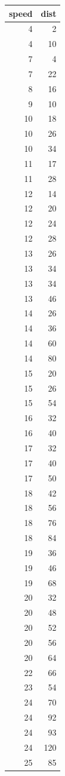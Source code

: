 \documentclass[
]{book}
\begin{document}
\begin{tabular}{r|r}
\hline
speed & dist\\
\hline
4 & 2\\
\hline
4 & 10\\
\hline
7 & 4\\
\hline
7 & 22\\
\hline
8 & 16\\
\hline
9 & 10\\
\hline
10 & 18\\
\hline
10 & 26\\
\hline
10 & 34\\
\hline
11 & 17\\
\hline
11 & 28\\
\hline
12 & 14\\
\hline
12 & 20\\
\hline
12 & 24\\
\hline
12 & 28\\
\hline
13 & 26\\
\hline
13 & 34\\
\hline
13 & 34\\
\hline
13 & 46\\
\hline
14 & 26\\
\hline
14 & 36\\
\hline
14 & 60\\
\hline
14 & 80\\
\hline
15 & 20\\
\hline
15 & 26\\
\hline
15 & 54\\
\hline
16 & 32\\
\hline
16 & 40\\
\hline
17 & 32\\
\hline
17 & 40\\
\hline
17 & 50\\
\hline
18 & 42\\
\hline
18 & 56\\
\hline
18 & 76\\
\hline
18 & 84\\
\hline
19 & 36\\
\hline
19 & 46\\
\hline
19 & 68\\
\hline
20 & 32\\
\hline
20 & 48\\
\hline
20 & 52\\
\hline
20 & 56\\
\hline
20 & 64\\
\hline
22 & 66\\
\hline
23 & 54\\
\hline
24 & 70\\
\hline
24 & 92\\
\hline
24 & 93\\
\hline
24 & 120\\
\hline
25 & 85\\
\hline
\end{tabular}
\end{document}
